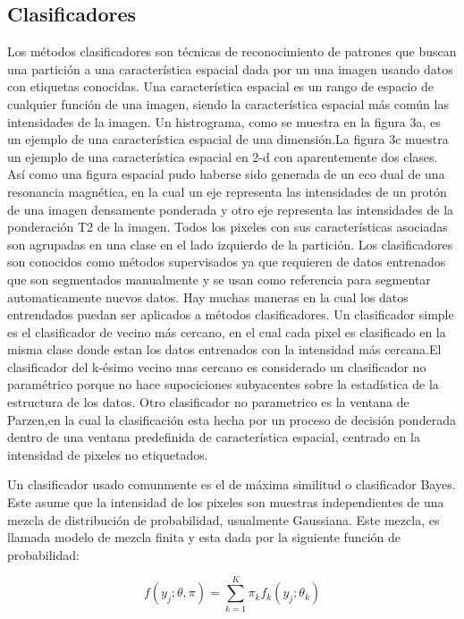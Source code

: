 \documentclass[12pt]{report}
\begin{document}
\subsection{Clasificadores}
Los métodos clasificadores son técnicas de reconocimiento de patrones que buscan una partición a una característica espacial dada por un una imagen usando datos con etiquetas conocidas.
Una característica espacial es un rango de espacio de cualquier función de una imagen, siendo la característica espacial más común las intensidades de la imagen. Un histrograma, como se muestra en la figura 3a, es un ejemplo de una característica espacial de una dimensión.La figura 3c muestra un ejemplo de una característica espacial en 2-d con aparentemente dos clases.
Así como una figura espacial pudo haberse sido generada de un eco dual de una resonancia magnética, en la cual un eje representa las intensidades de un protón de una imagen densamente ponderada y otro eje representa las intensidades de la ponderación T2 de la imagen.
Todos los pixeles con sus características asociadas son agrupadas en una clase en el lado izquierdo de la partición.
Los clasificadores son conocidos como métodos supervisados ya que requieren de datos entrenados que son segmentados manualmente y se usan como referencia para segmentar automaticamente nuevos datos.
Hay muchas maneras en la cual los datos entrendados puedan ser aplicados a métodos clasificadores. Un clasificador simple es el clasificador de vecino más cercano, en el cual cada pixel es clasificado en la misma clase donde estan los datos entrenados con la intensidad más cercana.El clasificador del k-ésimo vecino mas cercano es
considerado un clasificador no paramétrico porque no hace supociciones subyacentes sobre la estadística de la estructura de los datos.
Otro clasificador no parametrico es la ventana de Parzen,en  la cual la clasificación esta hecha por un proceso de decisión ponderada dentro de una ventana predefinida de característica espacial, centrado en la intensidad de pixeles no etiquetados.

Un clasificador usado comunmente es el de  máxima similitud o clasificador Bayes. Este asume que la intensidad de los pixeles son muestras independientes de una mezcla de distribución de probabilidad, usualmente Gaussiana. Este mezcla, es llamada modelo de mezcla finita y esta dada por la siguiente función de probabilidad:

\begin{equation} f(y_{j};\theta,\pi) = \sum_{k = 1}^{K} \pi_{k} f_{k} (y_{j} ; \theta_{k}) \end{equation}
\end{document}
